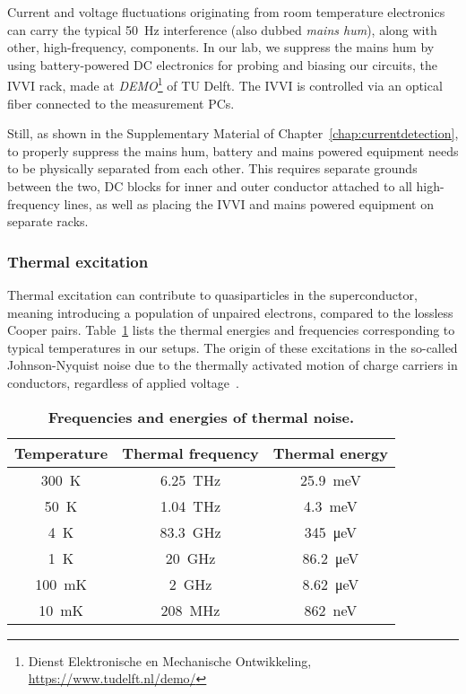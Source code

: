Current and voltage fluctuations originating from room temperature electronics can carry the typical \SI{50}{\hertz} interference (also dubbed \textit{mains hum}), along with other, high-frequency, components.
%
In our lab, we suppress the mains hum by using battery-powered DC electronics for probing and biasing our circuits, the IVVI rack, made at \textit{DEMO}\footnote{Dienst Elektronische en Mechanische Ontwikkeling, \url{https://www.tudelft.nl/demo/}} of TU Delft.
%
The IVVI is controlled via an optical fiber connected to the measurement PCs.

Still, as shown in the Supplementary Material of Chapter~\ref{chap:currentdetection}, to properly suppress the mains hum, battery and mains powered equipment needs to be physically separated from each other.
%
This requires separate grounds between the two, DC blocks for inner and outer conductor attached to all high-frequency lines, as well as placing the IVVI and mains powered equipment on separate racks.

\subsubsection{Thermal excitation}

Thermal excitation can contribute to quasiparticles in the superconductor, meaning introducing a population of unpaired electrons, compared to the lossless Cooper pairs.
%
Table~\ref{tab:fthermal} lists the thermal energies and frequencies corresponding to typical temperatures in our setups.
%
The origin of these excitations in the so-called Johnson-Nyquist noise due to the thermally activated motion of charge carriers in conductors, regardless of applied voltage~\cite{johnsonThermalAgitationElectricity1928,nyquistThermalAgitationElectric1928}.

\begin{table}
	\caption{\textbf{Frequencies and energies of thermal noise.}}
	\label{tab:fthermal}
\begin{tabular}{ccc}
	\hline \hline
	Temperature & Thermal frequency & Thermal energy \\ 
	\hline 
	\SI{300}{\kelvin} & \SI{6.25}{\tera\hertz} & \SI{25.9}{\milli\electronvolt} \\ 
	\SI{50}{\kelvin} & \SI{1.04}{\tera\hertz} & \SI{4.3}{\milli\electronvolt} \\ 
	\SI{4}{\kelvin} & \SI{83.3}{\giga\hertz} & \SI{345}{\micro\electronvolt} \\ 
	\SI{1}{\kelvin} & \SI{20}{\giga\hertz} & \SI{86.2}{\micro\electronvolt} \\ 
	\SI{100}{\milli\kelvin} & \SI{2}{\giga\hertz} & \SI{8.62}{\micro\electronvolt} \\ 
	\SI{10}{\milli\kelvin} & \SI{208}{\mega\hertz} & \SI{862}{\nano\electronvolt} \\ 
	\hline \hline
\end{tabular}
\end{table}

